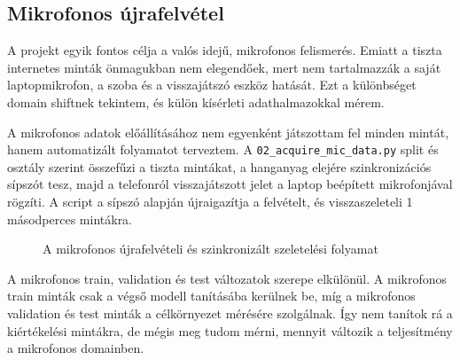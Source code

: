 \subsection{Mikrofonos újrafelvétel}
\label{subsec:mic_recording}

A projekt egyik fontos célja a valós idejű, mikrofonos felismerés. Emiatt a tiszta internetes minták önmagukban nem elegendőek, mert nem tartalmazzák a saját laptopmikrofon, a szoba és a visszajátszó eszköz hatását. Ezt a különbséget domain shiftnek tekintem, és külön kísérleti adathalmazokkal mérem.

A mikrofonos adatok előállításához nem egyenként játszottam fel minden mintát, hanem automatizált folyamatot terveztem. A \texttt{02\_acquire\_\allowbreak mic\_\allowbreak data.py} split és osztály szerint összefűzi a tiszta mintákat, a hanganyag elejére szinkronizációs sípszót tesz, majd a telefonról visszajátszott jelet a laptop beépített mikrofonjával rögzíti. A script a sípszó alapján újraigazítja a felvételt, és visszaszeleteli 1 másodperces mintákra.

\begin{figure}[H]
\centering
{}
\caption{A mikrofonos újrafelvételi és szinkronizált szeletelési folyamat}
\label{fig:mic_recording_pipeline}
\end{figure}

A mikrofonos train, validation és test változatok szerepe elkülönül. A mikrofonos train minták csak a végső modell tanításába kerülnek be, míg a mikrofonos validation és test minták a célkörnyezet mérésére szolgálnak. Így nem tanítok rá a kiértékelési mintákra, de mégis meg tudom mérni, mennyit változik a teljesítmény a mikrofonos domainben.

